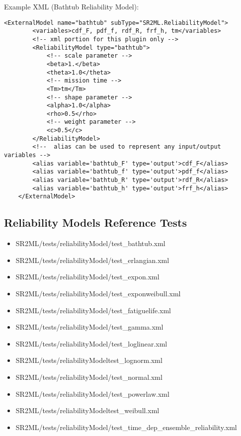 Example XML (Bathtub Reliability Model):
\begin{lstlisting}[style=XML]
	<ExternalModel name="bathtub" subType="SR2ML.ReliabilityModel">
		<variables>cdf_F, pdf_f, rdf_R, frf_h, tm</variables>
		<!-- xml portion for this plugin only -->
		<ReliabilityModel type="bathtub">
			<!-- scale parameter -->
			<beta>1.</beta>
			<theta>1.0</theta>
			<!-- mission time -->
			<Tm>tm</Tm>
			<!-- shape parameter -->
			<alpha>1.0</alpha>
			<rho>0.5</rho>
			<!-- weight parameter -->
			<c>0.5</c>
		</ReliabilityModel>
		<!--  alias can be used to represent any input/output variables -->
		<alias variable='bathtub_F' type='output'>cdf_F</alias>
		<alias variable='bathtub_f' type='output'>pdf_f</alias>
		<alias variable='bathtub_R' type='output'>rdf_R</alias>
		<alias variable='bathtub_h' type='output'>frf_h</alias>
	</ExternalModel>
\end{lstlisting}






\subsection{Reliability Models Reference Tests}
\begin{itemize}
	\item SR2ML/tests/reliabilityModel/test\_bathtub.xml
  \item SR2ML/tests/reliabilityModel/test\_erlangian.xml
	\item SR2ML/tests/reliabilityModel/test\_expon.xml
  \item SR2ML/tests/reliabilityModel/test\_exponweibull.xml
	\item SR2ML/tests/reliabilityModel/test\_fatiguelife.xml
  \item SR2ML/tests/reliabilityModel/test\_gamma.xml
	\item SR2ML/tests/reliabilityModel/test\_loglinear.xml
  \item SR2ML/tests/reliabilityModeltest\_lognorm.xml
	\item SR2ML/tests/reliabilityModel/test\_normal.xml
  \item SR2ML/tests/reliabilityModel/test\_powerlaw.xml
	\item SR2ML/tests/reliabilityModeltest\_weibull.xml
	\item SR2ML/tests/reliabilityModel/test\_time\_dep\_ensemble\_reliability.xml
\end{itemize}
